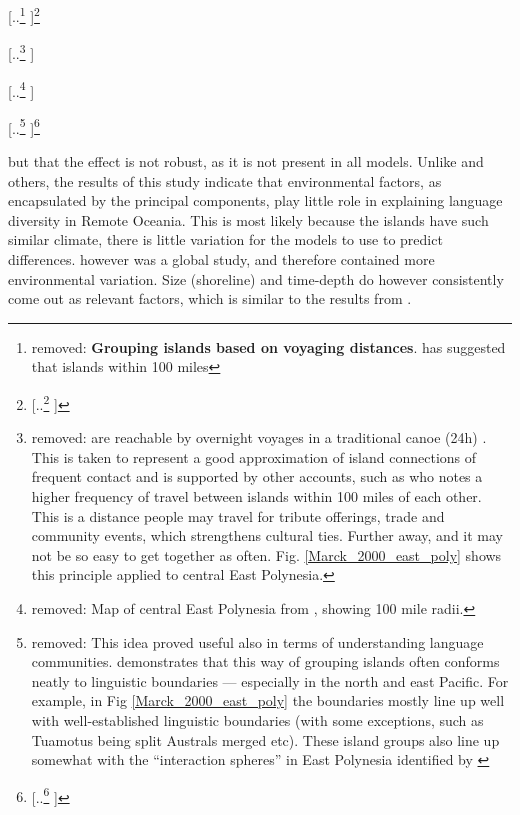 \documentclass[unnumsec,webpdf,modern,medium]{oup-authoring-template}
\providecommand{\DIFaddtex}[1]{{\protect\color{blue} \sf #1}} %
\providecommand{\DIFdeltex}[1]{{\protect\color{red} [..\footnote{removed: #1} ]}} %
\providecommand{\DIFaddbegin}{} %
\providecommand{\DIFaddend}{} %
\providecommand{\DIFdelend}{} %
\providecommand{\DIFdelFL}[1]{\DIFdel{#1}} %
\providecommand{\DIFadd}[1]{\texorpdfstring{\DIFaddtex{#1}}{#1}} %
\providecommand{\DIFdel}[1]{\texorpdfstring{\DIFdeltex{#1}}{}} %
\newcommand{\DIFaddincludegraphics}[2][]{{\color{blue}\fbox{\DIFOincludegraphics[#1]{#2}}}} %
\DeclareRobustCommand{\DIFaddbegin}{\DIFOaddbegin \let\includegraphics\DIFaddincludegraphics} %
\DeclareRobustCommand{\DIFaddend}{\DIFOaddend \let\includegraphics\DIFOincludegraphics} %
\DeclareRobustCommand{\DIFdelend}{\DIFOaddend \let\includegraphics\DIFOincludegraphics} %
\begin{document}


\DIFdel{\textbf{Grouping islands based on voyaging distances}. \citet{mark_1986, marck2000} has suggested that islands within 100 miles}\footnote{\DIFdel{Note that Marck uses \emph{land} miles, not \emph{sea} miles (Marck personal correspondence).}} %
\addtocounter{footnote}{-1}%
\DIFdel{are reachable by overnight voyages in a traditional canoe (24h) . This is taken to represent a good approximation of island connections of frequent contact and is supported by other accounts, such as \citep[38]{gladwin2009east} who notes a higher frequency of travel between islands within 100 miles of each other. This is a distance people may travel for tribute offerings, trade and community events, which strengthens cultural ties. Further away, and it may not be so easy to get together as often.
Fig. \ref{Marck_2000_east_poly} shows this principle applied to central East Polynesia.
}%

{%
\DIFdelFL{Map of central East Polynesia from \citet{marck2000}, showing 100 mile radii.}%
}

\DIFdel{This idea proved useful also in terms of understanding language communities. \citet{mark_1986, marck2000} demonstrates that this way of grouping islands often conforms neatly to linguistic boundaries --- especially in the north and east Pacific. For example, in Fig  \ref{Marck_2000_east_poly} the boundaries mostly line up well with well-established linguistic boundaries (with some exceptions, such as Tuamotus being split Australs merged etc). These island groups also line up somewhat with the ``interaction spheres'' in East Polynesia identified by \citet{rolett2002voyaging}}\footnote{\DIFdel{\citet{rolett2004environmental} consider islands within 50 km of each other as a meaningful unit, but do not extrapolate on why this is.}}%
\addtocounter{footnote}{-1}%
\DIFdelend \DIFaddbegin \DIFadd{but that the effect is not robust, as it is not present in all models. Unlike \citet{hua2019ecological} and others, the results of this study indicate that environmental factors, as encapsulated by the principal components, play little role in explaining language diversity in Remote Oceania}\DIFaddend . \DIFaddbegin \DIFadd{This is most likely because the islands have such similar climate, there is little variation for the models to use to predict differences. \citet{hua2019ecological} however was a global study, and therefore contained more environmental variation. Size (shoreline) and time-depth do however consistently come out as relevant factors, which is similar to the results from \citet{gavin2012island}.
}\DIFaddend 
\end{document}
